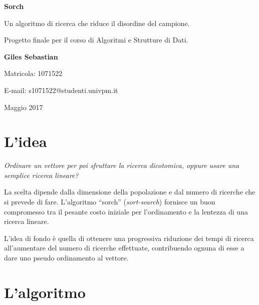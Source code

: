 \documentclass{article}
\begin{document}
\thispagestyle{plain}
\vspace*{\fill}
\begin{center}

    \begin{Huge}
    \textbf{Sorch}
    \end{Huge}
    \vspace{1cm}

    Un algoritmo di ricerca che riduce il disordine del campione.
    \vspace{1cm}

    Progetto finale per il corso di Algoritmi e Strutture di Dati.
    \vspace{1cm}

    \begin{Large}
    \textbf{Giles Sebastian}
    \end{Large}
    \vspace{1cm}

    Matricola: 1071522
    \vspace{0.4cm}

    E-mail: s1071522@studenti.univpm.it
    \vspace{0.4cm}

    Maggio 2017

\end{center}
\vspace*{\fill}

\newpage
{}
\section{L'idea}

    \textit{Ordinare un vettore per poi sfruttare la ricerca dicotomica,
    oppure usare una semplice ricerca lineare?}

    La scelta dipende dalla dimensione della popolazione e dal numero
    di ricerche che si prevede di fare.
    L'algoritmo “sorch” (\textit{sort-search}) fornisce un buon compromesso tra
    il pesante costo iniziale per l'ordinamento e la lentezza di una ricerca
    lineare.

    L'idea di fondo è quella di ottenere una progressiva riduzione dei tempi
    di ricerca all'aumentare del numero di ricerche effettuate, contribuendo
    ognuna di esse a dare uno pseudo ordinamento al vettore.

\section{L'algoritmo}
\end{document}
